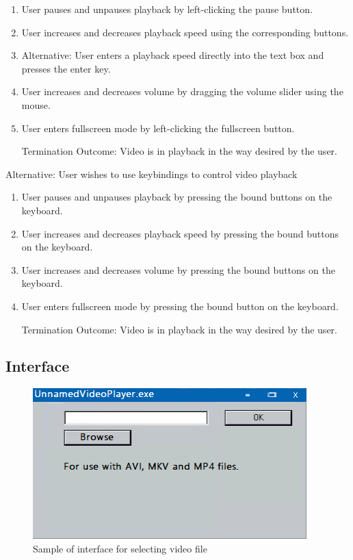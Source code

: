 \documentclass[10pt,conference,onecolumn,compsoc]{IEEEtran}
\begin{document}
\begin{enumerate}
\item User pauses and unpauses playback by left-clicking the pause button. 
\item User increases and decreases playback speed using the corresponding buttons.  
\item Alternative: User enters a playback speed directly into the text box and presses the enter key.
\item User increases and decreases volume by dragging the volume slider using the mouse.
\item User enters fullscreen mode by left-clicking the fullscreen button.
\item[Termination Outcome:] Video is in playback in the way desired by the user.
\end{enumerate}

Alternative: User wishes to use keybindings to control video playback
\begin{enumerate}
\item User pauses and unpauses playback by pressing the bound buttons on the keyboard.
\item User increases and decreases playback speed by pressing the bound buttons on the keyboard.
\item User increases and decreases volume by pressing the bound buttons on the keyboard.
\item User enters fullscreen mode by pressing the bound button on the keyboard.
\item[Termination Outcome:] Video is in playback in the way desired by the user.
\end{enumerate}


\subsection{Interface}

\begin{figure}[H]
\begin{center}
\includegraphics[scale=3]{FileSearchMockup.png}
\caption{Sample of interface for selecting video file}
\label{FileSearchMockup}
\end{center}
\end{figure}
\end{document}
